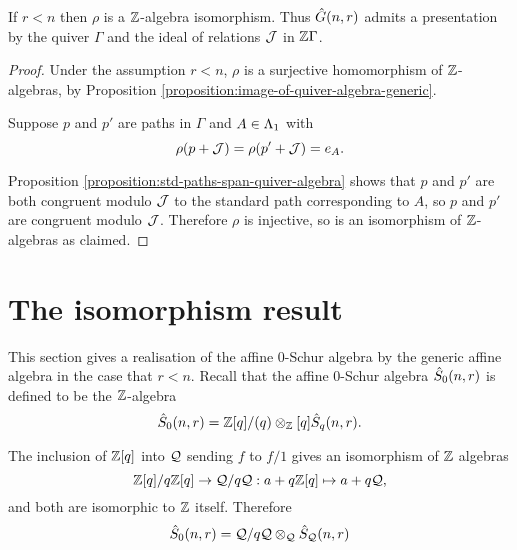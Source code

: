 \documentclass[a4paper, 11pt]{report}
\begin{document}
\begin{theorem}\label{theorem:presentation-generic-algebra}
If $r<n$ then $\rho$ is a $\mathbb{Z}$-algebra isomorphism. Thus $\hat{G}(n,r)$ admits a presentation by the quiver $\Gamma$ and the ideal of relations $\mathcal{J}$ in $\mathbb{Z}\Gamma$.
\end{theorem}

\begin{proof}
Under the assumption $r<n$, $\rho$ is a surjective homomorphism of $\mathbb{Z}$-algebras, by Proposition \ref{proposition:image-of-quiver-algebra-generic}.

Suppose $p$ and $p'$ are paths in $\Gamma$ and $A\in\Lambda_1{}$ with
\begin{equation*}
\rho(p+\mathcal{J}) = \rho(p'+\mathcal{J}) = e_A.
\end{equation*}

Proposition \ref{proposition:std-paths-span-quiver-algebra} shows that $p$ and $p'$ are both congruent modulo $\mathcal{J}$ to the standard path corresponding to $A$, so $p$ and $p'$ are congruent modulo $\mathcal{J}$. Therefore $\rho$ is injective, so is an isomorphism of $\mathbb{Z}$-algebras as claimed. 
\end{proof}


\section{The isomorphism result}

This section gives a realisation of the affine $0$-Schur algebra by the generic affine algebra in the case that $r<n$. Recall that the affine $0$-Schur algebra $\hat{S}_0(n,r)$ is defined to be the $\mathbb{Z}$-algebra
\begin{equation*}
\hat{S}_0(n,r) = \mathbb{Z}[q]/{(q)}\otimes_{\mathbb{Z}}[q]\hat{S}_q(n,r).
\end{equation*}

The inclusion of $\mathbb{Z}[q]$ into $\mathcal{Q}$ sending $f$ to $f/1$ gives an isomorphism of $\mathbb{Z}$ algebras
\begin{equation*}
\mathbb{Z}[q]/{q\mathbb{Z}[q]}\to\mathcal{Q}/{q\mathcal{Q}}: a + q\mathbb{Z}[q] \mapsto a + q\mathcal{Q},
\end{equation*}
and both are isomorphic to $\mathbb{Z}$ itself. Therefore
\begin{equation*}
\hat{S}_0(n,r) = \mathcal{Q}/{q\mathcal{Q}}\otimes_{\mathcal{Q}} \hat{S}_{\mathcal{Q}}(n,r)
\end{equation*}
\end{document}
